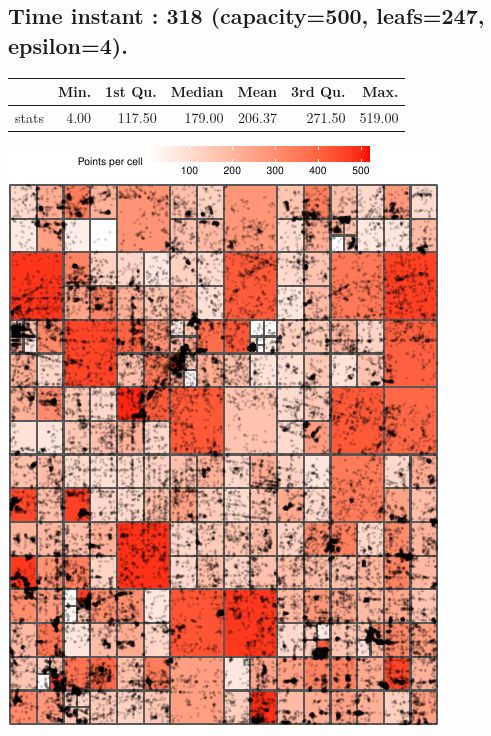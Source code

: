 \documentclass[
  9pt,
  landscape]{article}
\author{}
\date{\vspace{-2.5em}}
\begin{document}
\hypertarget{time-instant-318-capacity500-leafs247-epsilon4.}{%
\subsection{Time instant : 318 (capacity=500, leafs=247,
epsilon=4).}\label{time-instant-318-capacity500-leafs247-epsilon4.}}

\begin{minipage}{0.5\textwidth} 
\centering 
\begin{tabular}{rrrrrrr}
  \hline
 & Min. & 1st Qu. & Median & Mean & 3rd Qu. & Max. \\ 
  \hline
stats & 4.00 & 117.50 & 179.00 & 206.37 & 271.50 & 519.00 \\ 
   \hline
\end{tabular}
\vspace{0.5cm} 


\includegraphics[width=1\linewidth,height=0.8\textheight]{distance_files/figure-latex/p1_318_500_4-1} 

\end{minipage} 
\end{document}
